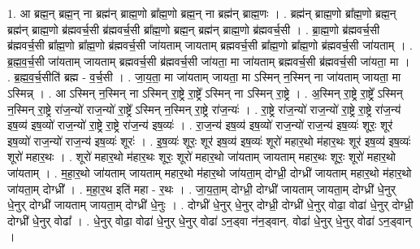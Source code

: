 \documentclass[17pt]{extarticle}
\begin{document}
1. आ ब्रह्म॒न् ब्रह्म॒न् ना ब्रह्म॑न् ब्राह्म॒णो ब्रा᳚ह्म॒णो ब्रह्म॒न् ना ब्रह्म॑न् ब्राह्म॒णः । . ब्रह्म॑न् ब्राह्म॒णो ब्रा᳚ह्म॒णो ब्रह्म॒न् ब्रह्म॑न् ब्राह्म॒णो ब्र॑ह्मवर्च॒सी ब्र॑ह्मवर्च॒सी ब्रा᳚ह्म॒णो ब्रह्म॒न् ब्रह्म॑न् ब्राह्म॒णो ब्र॑ह्मवर्च॒सी । . ब्रा॒ह्म॒णो ब्र॑ह्मवर्च॒सी ब्र॑ह्मवर्च॒सी ब्रा᳚ह्म॒णो ब्रा᳚ह्म॒णो ब्र॑ह्मवर्च॒सी जा॑यताम् जायताम् ब्रह्मवर्च॒सी ब्रा᳚ह्म॒णो ब्रा᳚ह्म॒णो ब्र॑ह्मवर्च॒सी जा॑यताम् । . ब्र॒ह्म॒व॒र्च॒सी जा॑यताम् जायताम् ब्रह्मवर्च॒सी ब्र॑ह्मवर्च॒सी जा॑यता॒ मा जा॑यताम् ब्रह्मवर्च॒सी ब्र॑ह्मवर्च॒सी जा॑यता॒ मा । . ब्र॒ह्म॒व॒र्च॒सीति॑ ब्रह्म - व॒र्च॒सी । . जा॒य॒ता॒ मा जा॑यताम् जायता॒ मा ऽस्मिन् न॒स्मिन् ना जा॑यताम् जायता॒ मा ऽस्मिन्न् । . आ ऽस्मिन् न॒स्मिन् ना ऽस्मिन् रा॒ष्ट्रे रा॒ष्ट्रे᳚ ऽस्मिन् ना ऽस्मिन् रा॒ष्ट्रे । . अ॒स्मिन् रा॒ष्ट्रे रा॒ष्ट्रे᳚ ऽस्मिन् न॒स्मिन् रा॒ष्ट्रे रा॑ज॒न्यो॑ राज॒न्यो॑ रा॒ष्ट्रे᳚ ऽस्मिन् न॒स्मिन् रा॒ष्ट्रे रा॑ज॒न्यः॑ । . रा॒ष्ट्रे रा॑ज॒न्यो॑ राज॒न्यो॑ रा॒ष्ट्रे रा॒ष्ट्रे रा॑ज॒न्य॑ इष॒व्य॑ इष॒व्यो॑ राज॒न्यो॑ रा॒ष्ट्रे रा॒ष्ट्रे रा॑ज॒न्य॑ इष॒व्यः॑ । . रा॒ज॒न्य॑ इष॒व्य॑ इष॒व्यो॑ राज॒न्यो॑ राज॒न्य॑ इष॒व्यः॑ शूरः॒ शूर॑ इष॒व्यो॑ राज॒न्यो॑ राज॒न्य॑ इष॒व्यः॑ शूरः॑ । . इ॒ष॒व्यः॑ शूरः॒ शूर॑ इष॒व्य॑ इष॒व्यः॑ शूरो॑ महार॒थो म॑हार॒थः शूर॑ इष॒व्य॑ इष॒व्यः॑ शूरो॑ महार॒थः । . शूरो॑ महार॒थो म॑हार॒थः शूरः॒ शूरो॑ महार॒थो जा॑यताम् जायताम् महार॒थः शूरः॒ शूरो॑ महार॒थो जा॑यताम् । . म॒हा॒र॒थो जा॑यताम् जायताम् महार॒थो म॑हार॒थो जा॑यता॒म् दोग्ध्री॒ दोग्ध्री॑ जायताम् महार॒थो म॑हार॒थो जा॑यता॒म् दोग्ध्री᳚ । . म॒हा॒र॒थ इति॑ महा - र॒थः । . जा॒य॒ता॒म् दोग्ध्री॒ दोग्ध्री॑ जायताम् जायता॒म् दोग्ध्री॑ धे॒नुर् धे॒नुर् दोग्ध्री॑ जायताम् जायता॒म् दोग्ध्री॑ धे॒नुः । . दोग्ध्री॑ धे॒नुर् धे॒नुर् दोग्ध्री॒ दोग्ध्री॑ धे॒नुर् वोढा॒ वोढा॑ धे॒नुर् दोग्ध्री॒ दोग्ध्री॑ धे॒नुर् वोढा᳚ । . धे॒नुर् वोढा॒ वोढा॑ धे॒नुर् धे॒नुर् वोढा॑ ऽन॒ड्वा न॑न॒ड्वान्. वोढा॑ धे॒नुर् धे॒नुर् वोढा॑ ऽन॒ड्वान् । \newline
\end{document}
